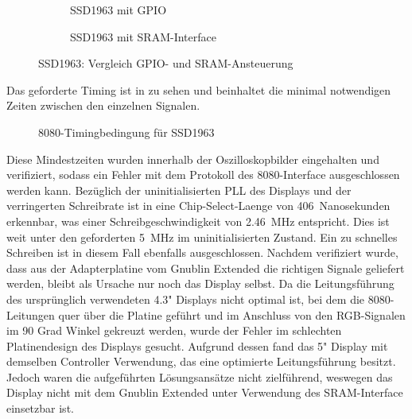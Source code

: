 \begin{figure}[htp]
        \begin{center}
        \begin{subfigure}[htp]{1\textwidth}
			\centering
	\caption{SSD1963 mit GPIO}
			\label{fig:ssd1963_gpio}
		\end{subfigure}


        \begin{subfigure}[htp]{1\textwidth}
	\centering
{}
	\caption{SSD1963 mit SRAM-Interface}
	\label{fig:ssd1963_sram}
\end{subfigure}

		\end{center}
\caption{SSD1963: Vergleich GPIO- und SRAM-Ansteuerung}
	\label{fig:ssd1963_gpio_sram}
\end{figure}
\newpage
Das geforderte Timing ist in  zu sehen und beinhaltet die minimal notwendigen Zeiten zwischen den einzelnen Signalen.
\begin{figure}[htp]
	\centering
{}
	\caption{8080-Timingbedingung für SSD1963}
	\label{fig:ssd1963_timing_constraints}
\end{figure}
Diese Mindestzeiten wurden innerhalb der Oszilloskopbilder eingehalten und verifiziert, sodass ein Fehler mit dem Protokoll des 8080-Interface ausgeschlossen werden kann. Bezüglich der uninitialisierten PLL des Displays und der verringerten Schreibrate ist in  eine Chip-Select-Laenge von 406~Nanosekunden erkennbar, was einer Schreibgeschwindigkeit von 2.46~MHz entspricht. Dies ist weit unter den geforderten 5~MHz im uninitialisierten Zustand. Ein zu schnelles Schreiben ist in diesem Fall ebenfalls ausgeschlossen. Nachdem verifiziert wurde, dass aus der Adapterplatine vom Gnublin Extended die richtigen Signale geliefert werden, bleibt als Ursache nur noch das Display selbst. Da die Leitungsführung des ursprünglich verwendeten 4.3" Displays nicht optimal ist, bei dem die 8080-Leitungen quer über die Platine geführt und im Anschluss von den RGB-Signalen im 90 Grad Winkel gekreuzt werden, wurde der Fehler im schlechten Platinendesign des Displays gesucht. Aufgrund dessen fand das 5" Display mit demselben Controller Verwendung, das eine optimierte Leitungsführung besitzt. Jedoch waren die aufgeführten Lösungsansätze nicht zielführend, weswegen das Display nicht mit dem Gnublin Extended unter Verwendung des SRAM-Interface einsetzbar ist.